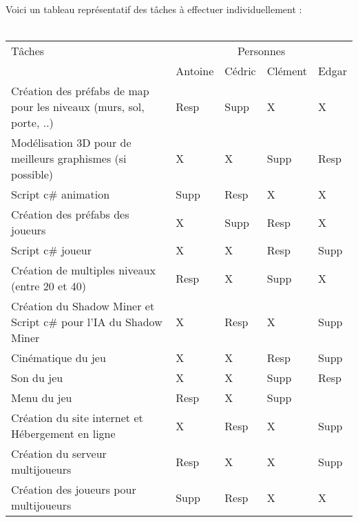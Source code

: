 \documentclass[titlepage, 13px, a4paper]{article}
\begin{document}
\paragraph{} \hspace{0pt} \\ 
Voici un tableau représentatif des tâches à effectuer individuellement :
\\ \\
{\normalsize
	\begin{tabular}{|p{6cm}|p{1.2cm}|p{1.2cm}|p{1.2cm}|p{1.2cm}|}
		\hline
		Tâches & \multicolumn{4}{|c|}{Personnes} \\ 
		\cline{2-5}
			& Antoine & Cédric & Clément & Edgar \\
		\hline
		Création des préfabs de map pour les niveaux (murs, sol, porte, ..) & Resp\footnotemark[1] & Supp\footnotemark[2] & X & X \\
		\hline
		Modélisation 3D pour de meilleurs graphismes (si possible) & X & X & Supp\footnotemark[2] & Resp\footnotemark[1] \\
		\hline
		Script c\# animation & Supp\footnotemark[2] & Resp\footnotemark[1] & X & X \\
		\hline
		Création des préfabs des joueurs & X & Supp\footnotemark[2] & Resp\footnotemark[1] & X \\
		\hline
		Script c\# joueur & X & X & Resp\footnotemark[1] & Supp\footnotemark[2] \\
		\hline
		Création de multiples niveaux (entre 20 et 40) & Resp\footnotemark[1] & X & Supp\footnotemark[2] & X \\
		\hline
		Création du Shadow Miner et Script c\# pour l'IA du Shadow Miner & X & Resp\footnotemark[1] & X & Supp\footnotemark[2] \\
		\hline
		Cinématique du jeu & X & X & Resp\footnotemark[1] & Supp\footnotemark[2] \\
		\hline
		Son du jeu & X & X & Supp\footnotemark[2] & Resp\footnotemark[1] \\
		\hline
		Menu du jeu & Resp\footnotemark[1] & X & Supp\footnotemark[2] & \\
		\hline
		Création du site internet et Hébergement en ligne & X & Resp\footnotemark[1] & X & Supp\footnotemark[2] \\
		\hline
		Création du serveur multijoueurs & Resp\footnotemark[1] & X & X & Supp\footnotemark[2] \\
		\hline
		Création des joueurs pour multijoueurs & Supp\footnotemark[2] & Resp\footnotemark[1] & X & X \\

\end{tabular}}
\end{document}

